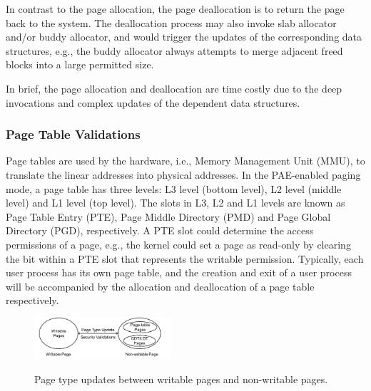 In contrast to the page allocation, the page deallocation is to return the page back to the system.
The deallocation process may also invoke slab allocator and/or buddy allocator, and would trigger the updates of the corresponding data structures,
e.g., the buddy allocator always attempts to merge adjacent freed blocks into a large permitted size.

In brief, the page allocation and deallocation are time costly due to the deep invocations and complex updates of the dependent data structures.


\subsubsection{Page Table Validations}\label{sec:pv-security}
Page tables are used by the hardware, i.e., Memory Management Unit (MMU), to translate the linear addresses into physical addresses.
In the PAE-enabled paging mode, a page table has three levels: L3 level (bottom level), L2 level (middle level) and L1 level (top level).
The slots in L3, L2 and L1 levels are known as Page Table Entry (PTE), Page Middle Directory (PMD) and Page Global Directory (PGD), respectively.
A PTE slot could determine the access permissions of a page, e.g., the kernel could set a page as read-only by clearing the bit within a PTE slot that represents the writable permission.
Typically, each user process has its own page table, and the creation and exit of a user process will be accompanied by the allocation and deallocation of a page table respectively.
\begin{figure}[ht]
\centering
\includegraphics[width=0.45\textwidth]{image/background/page-type-update.png} \\
\caption{Page type updates between writable pages and non-writable pages. }
\label{fig:page-type-updates}
\end{figure}



